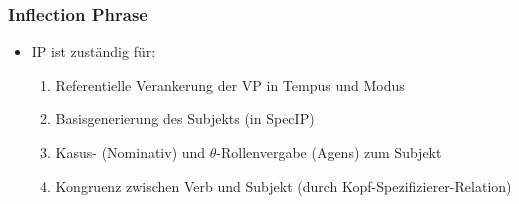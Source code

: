 \begin{frame}
\frametitle{Inflection Phrase}


	\begin{itemize}
		\item IP ist zuständig für:
		\begin{enumerate}
			\item Referentielle Verankerung der VP in Tempus und Modus
			\item Basisgenerierung des Subjekts (in SpecIP)
			\item Kasus- (Nominativ) und $\theta$-Rollenvergabe (Agens) zum Subjekt
			\item Kongruenz zwischen Verb und Subjekt (durch Kopf-Spezifizierer-Relation)
		\end{enumerate}				
	\end{itemize}


\begin{minipage}[b]{0.48\textwidth}
	\centering
\end{minipage}  
%
\pause            
\begin{minipage}[b]{0.48\textwidth}
	\centering
\end{minipage}  

\end{frame}


